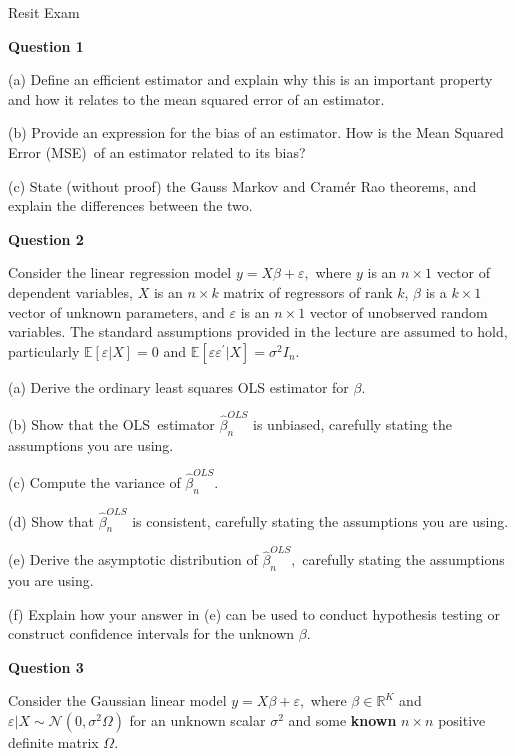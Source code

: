 \documentclass{article}
\begin{document}
\begin{center}
{\Large Resit Exam}
\end{center}

\textbf{Question 1}

(a) Define an efficient estimator and explain why this is an important
property and how it relates to the mean squared error of an estimator.

(b) Provide an expression for the bias of an estimator. How is the Mean
Squared Error (MSE)\ of an estimator related to its bias?

(c) State (without proof) the Gauss Markov and Cram\'{e}r Rao theorems, and
explain the differences between the two.

\bigskip

\textbf{Question 2}

Consider the linear regression model $y=X\beta +\varepsilon ,$ where $y$ is
an $n\times 1$ vector of dependent variables, $X$ is an $n\times k$ matrix
of regressors of rank $k$, $\beta $ is a $k\times 1$ vector of unknown
parameters, and $\varepsilon $ is an $n\times 1$ vector of unobserved random
variables. The standard assumptions provided in the lecture are assumed to
hold, particularly $\mathbb{E}\left[ \varepsilon |X\right] =0$ and $\mathbb{E%
}\left[ \varepsilon \varepsilon ^{\prime }|X\right] =\sigma ^{2}I_{n}.$

(a) Derive the ordinary least squares OLS estimator for $\beta .$

(b) Show that the OLS\ estimator $\hat{\beta}_{n}^{OLS}$ is unbiased,
carefully stating the assumptions you are using.

(c) Compute the variance of $\hat{\beta}_{n}^{OLS}.$

(d) Show that $\hat{\beta}_{n}^{OLS}$ is consistent, carefully stating the
assumptions you are using.

(e) Derive the asymptotic distribution of $\hat{\beta}_{n}^{OLS},$ carefully
stating the assumptions you are using$.$

(f) Explain how your answer in (e) can be used to conduct hypothesis testing
or construct confidence intervals for the unknown $\beta .$

\bigskip

\textbf{Question 3 }

Consider the Gaussian linear model $y=X\beta +\varepsilon ,$ where $\beta
\in \mathbb{R}^{K}$ and $\varepsilon |X\sim \mathcal{N}\left( 0,\sigma
^{2}\Omega \right) $ for an unknown scalar $\sigma ^{2}$ and some \textbf{%
known} $n\times n$ positive definite matrix $\Omega $.
\end{document}
